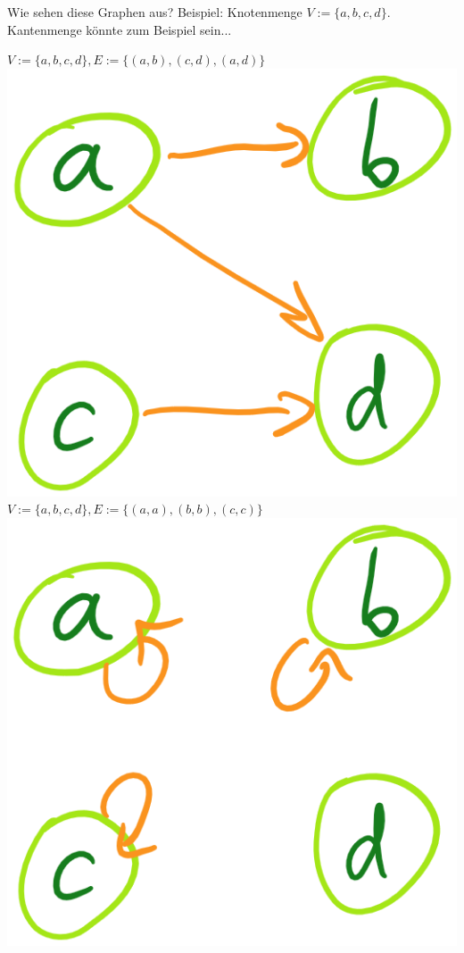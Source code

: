 \begin{frame}{Wie sehen diese Graphen aus?}
	Beispiel: Knotenmenge $V := \{a, b, c, d\}$. Kantenmenge könnte zum Beispiel sein...
	\begin{itemize}
		\pitem $V := \{a, b, c, d\}, E := \{(a,b), (c, d), (a, d)\}$\\
		\p\includegraphics[scale=0.17]{images/graph_0_01.png}
		\pitem $V := \{a, b, c, d\}, E := \{(a,a), (b,b), (c,c)\}$\\
		\p\includegraphics[scale=0.17]{images/graph_0_02.png}

\end{itemize}
\end{frame}
